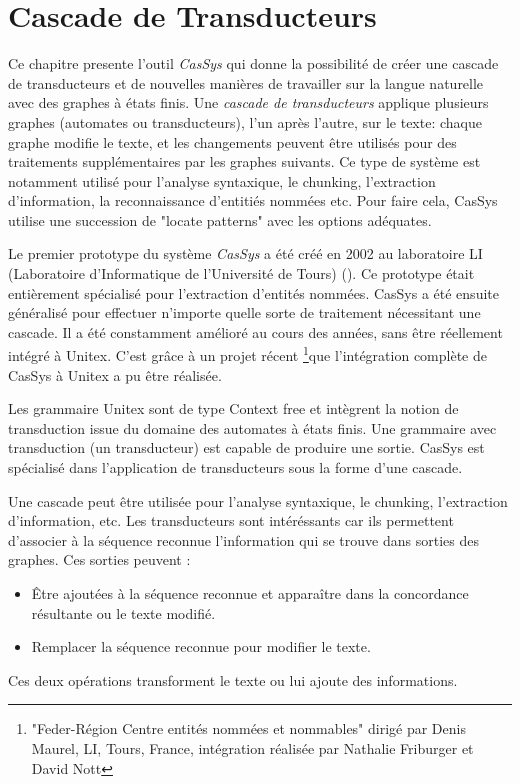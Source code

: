 \chapter{Cascade de Transducteurs}
\label{chap-cassys}

Ce chapitre presente l'outil \textit{CasSys} qui donne la possibilité de créer une cascade
de  transducteurs et de nouvelles manières de travailler sur la langue naturelle avec des 
graphes à états finis. Une \textit{cascade de transducteurs} 
applique plusieurs graphes (automates ou transducteurs), l'un après l'autre, sur le texte: chaque
graphe modifie le texte, et les changements peuvent être utilisés pour des traitements supplémentaires
par les graphes suivants. Ce type de  système est notamment utilisé pour l'analyse syntaxique, le chunking,
l'extraction d'information, la reconnaissance d'entitiés nommées etc. Pour faire cela, CasSys utilise
une succession de "locate patterns" avec les options adéquates.

\bigskip
\noindent Le premier prototype du système \textit{CasSys}   a été créé en 2002 au 
laboratoire LI (Laboratoire d'Informatique de l'Université de Tours) (\cite{these-nathalie}). 
Ce prototype était entièrement spécialisé pour l'extraction d'entités nommées. CasSys a été  
ensuite généralisé pour effectuer n'importe quelle sorte de traitement nécessitant une cascade. 
Il a été constamment amélioré au cours des années, sans être réellement intégré à Unitex. 
C'est grâce à un projet récent \footnote{"Feder-Région Centre entités nommées et nommables" 
dirigé par Denis Maurel, LI, Tours, France, intégration réalisée par Nathalie Friburger et
David Nott}que l'intégration complète  de CasSys à Unitex a pu être réalisée.

Les grammaire Unitex sont de type Context free et intègrent la notion de transduction issue
du domaine des automates à états finis. Une grammaire avec transduction (un  transducteur) est
capable de produire une sortie. CasSys est spécialisé dans l'application de transducteurs sous
la forme d'une cascade.

\bigskip
Une cascade peut être utilisée pour l'analyse syntaxique, le chunking, l'extraction d'information, etc. 
\noindent Les transducteurs sont intéréssants car ils permettent d'associer à la séquence
reconnue l'information qui se trouve dans sorties des graphes.
Ces  sorties peuvent :
\begin{itemize}
\item Être ajoutées à la séquence reconnue et apparaître dans la concordance résultante ou le texte modifié.
\item Remplacer la séquence reconnue pour modifier le texte.
\end{itemize}
\noindent Ces deux  opérations transforment le texte ou lui ajoute des informations.

